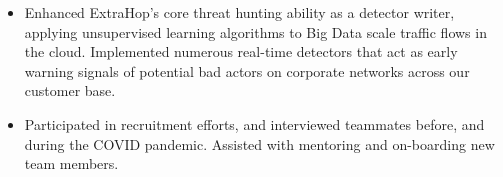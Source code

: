 \documentclass[10pt]{article}
\newcommand{\tabularxwidth}{\textwidth}
\begin{document}
\begin{minipage}{\tabularxwidth}
\begin{itemize}[noitemsep, topsep=3pt, parsep=0pt, partopsep=0pt]
                \item 
    Enhanced ExtraHop's core threat hunting ability as a detector writer, applying unsupervised learning algorithms to Big Data scale traffic flows in the cloud. Implemented numerous real-time detectors that act as early warning signals of potential bad actors on corporate networks across our customer base.
            
                \item 
    Participated in recruitment efforts, and interviewed teammates before, and during the COVID pandemic. Assisted with mentoring and on-boarding new team members.
            
        \end{itemize}

        
            \vspace{.3em}
        

    \end{minipage}
    
\end{document}
